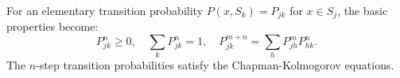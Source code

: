 For an elementary transition probability $P(x, S_k) = P_{jk}$ for $x \in S_j$, the basic properties become:
$$P_{jk}^n \geq 0, \quad \sum_k P_{jk}^n = 1, \quad P_{jk}^{m+n} = \sum_h P_{jh}^m P_{hk}^n.$$
The $n$-step transition probabilities satisfy the Chapman-Kolmogorov equations.

